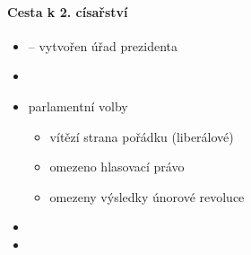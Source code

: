 \paragraph{Cesta k 2. císařství}
\begin{itemize}
\item {} -- vytvořen úřad prezidenta
\item {}
\item {} parlamentní volby
	\begin{itemize}
	\item vítězí strana pořádku (liberálové)
	\item omezeno hlasovací právo
	\item omezeny výsledky únorové revoluce 
	\end{itemize}
\item {}
\item {}
\end{itemize}

